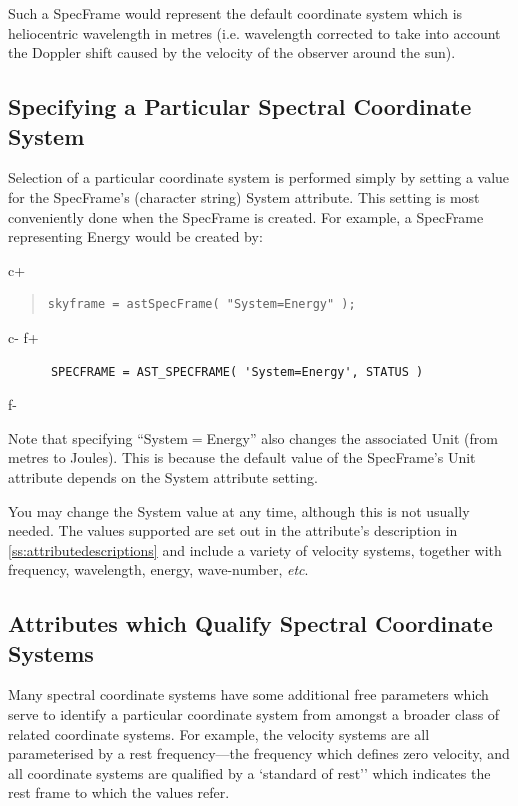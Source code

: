 \documentclass[twoside,11pt]{article}
\newcommand{\appref}[1]{Appendix~\ref{#1}}
\renewcommand{\appref}[1]{\ref{#1}}
\begin{document}
Such a SpecFrame would represent the default coordinate system which is 
heliocentric wavelength in metres (i.e. wavelength corrected to take into 
account the Doppler shift caused by the velocity of the observer around the 
sun).

\subsection{Specifying a Particular Spectral Coordinate System}

Selection of a particular coordinate system is performed simply by
setting a value for the SpecFrame's (character string) System
attribute. This setting is most conveniently done when the SpecFrame is
created. For example, a SpecFrame representing Energy would be created by:

c+
\begin{quote}
\small
\begin{verbatim}
skyframe = astSpecFrame( "System=Energy" );
\end{verbatim}
\normalsize
\end{quote}
c-
f+
\small
\begin{verbatim}
      SPECFRAME = AST_SPECFRAME( 'System=Energy', STATUS )
\end{verbatim}
\normalsize
f-

Note that specifying ``System$=$Energy'' also changes the associated
Unit (from metres to Joules). This is because the default value
of the SpecFrame's Unit attribute depends on the System attribute setting.

You may change the System value at any time, although this is not
usually needed.  The values supported are set out in the attribute's
description in \appref{ss:attributedescriptions} and include a variety
of velocity systems, together with frequency, wavelength, energy,
wave-number, \emph{etc}.

\subsection{Attributes which Qualify Spectral Coordinate Systems}

Many spectral coordinate systems have some additional free parameters
which serve to identify a particular coordinate system from amongst a
broader class of related coordinate systems. For example, the
velocity systems are all parameterised by a rest frequency---the
frequency which defines zero velocity, and all coordinate systems 
are qualified by a `standard of rest'' which indicates the rest frame to
which the values refer.
\end{document}
